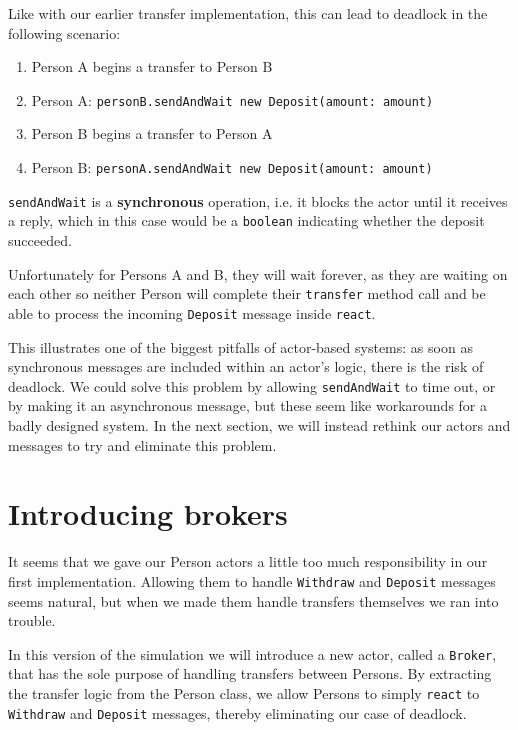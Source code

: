 \documentclass[a4paper,12pt]{kth-mag}
\begin{document}
Like with our earlier transfer implementation, this can lead to deadlock in the following scenario:

\begin{enumerate}
\item Person A begins a transfer to Person B
\item Person A: \texttt{personB.sendAndWait new Deposit(amount: amount)}
\item Person B begins a transfer to Person A
\item Person B: \texttt{personA.sendAndWait new Deposit(amount: amount)}
\end{enumerate}

\texttt{sendAndWait} is a \textbf{synchronous} operation, i.e. it blocks the actor until it receives a reply, which in this case would be a \texttt{boolean} indicating whether the deposit succeeded.

Unfortunately for Persons A and B, they will wait forever, as they are waiting on each other so neither Person will complete their \texttt{transfer} method call and be able to process the incoming \texttt{Deposit} message inside \texttt{react}.

This illustrates one of the biggest pitfalls of actor-based systems: as soon as synchronous messages are included within an actor's logic, there is the risk of deadlock. We could solve this problem by allowing \texttt{sendAndWait} to time out, or by making it an asynchronous message, but these seem like workarounds for a badly designed system. In the next section, we will instead rethink our actors and messages to try and eliminate this problem.

\section{Introducing brokers}

It seems that we gave our Person actors a little too much responsibility in our first implementation. Allowing them to handle \texttt{Withdraw} and \texttt{Deposit} messages seems natural, but when we made them handle transfers themselves we ran into trouble.

In this version of the simulation we will introduce a new actor, called a \texttt{Broker}, that has the sole purpose of handling transfers between Persons. By extracting the transfer logic from the Person class, we allow Persons to simply \texttt{react} to \texttt{Withdraw} and \texttt{Deposit} messages, thereby eliminating our case of deadlock. 
\end{document}
